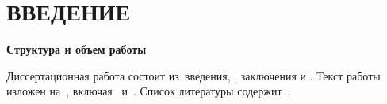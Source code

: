 \chapter*{ВВЕДЕНИЕ}                         

\newcommand{\actuality}{\textbf{\actualityTXT}}
\newcommand{\progress}{\textbf{\progressTXT}}
\newcommand{\aim}{{\textbf\aimTXT}}
\newcommand{\tasks}{\textbf{\tasksTXT}}
\newcommand{\novelty}{\textbf{\noveltyTXT}}
\newcommand{\influence}{\textbf{\influenceTXT}}
\newcommand{\methods}{\textbf{\methodsTXT}}
\newcommand{\defpositions}{\textbf{\defpositionsTXT}}
\newcommand{\reliability}{\textbf{\reliabilityTXT}}
\newcommand{\probation}{\textbf{\probationTXT}}
\newcommand{\contribution}{\textbf{\contributionTXT}}
\newcommand{\pasport}{\textbf{\pasportTXT}}
\newcommand{\publications}{\textbf{\publicationsTXT}}

 

\textbf{Структура и объем работы} 

Диссертационная работа состоит из~введения, , заключения и . Текст работы изложен на~, включая~ и~. Список литературы содержит~.